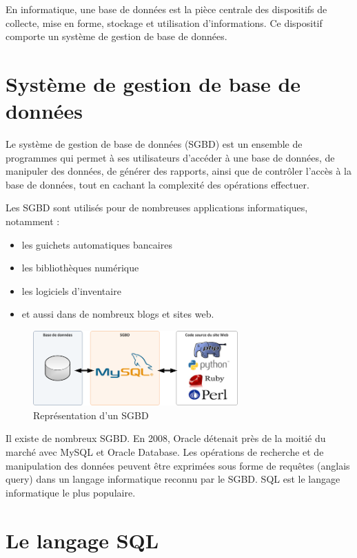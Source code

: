 \documentclass[oneside,13pt,a4paper]{report}
\begin{document}
En informatique, une base de données est la pièce centrale des dispositifs de collecte, mise en forme, stockage et utilisation d'informations.
Ce dispositif comporte un système de gestion de base de données.

\section{Système de gestion de base de données}
\label{sgbd}
Le système de gestion de base de données (SGBD) est un ensemble de programmes qui permet à ses utilisateurs d'accéder à une base de données,
de manipuler des données, de générer des rapports, ainsi que de contrôler l'accès à la base de données,
tout en cachant la complexité des opérations effectuer.

Les SGBD sont utilisés pour de nombreuses applications informatiques, notamment :
\begin{itemize}
	\item les guichets automatiques bancaires
	\item les bibliothèques numérique
	\item les logiciels d'inventaire
	\item et aussi dans de nombreux blogs et sites web.
\end{itemize}


\begin{figure}[h]
	\centering
	\includegraphics[width=0.7\textwidth]{img/sgbd.png}
	\caption{Représentation d'un SGBD}
\end{figure}

Il existe de nombreux SGBD. En 2008, Oracle détenait près de la moitié du marché avec MySQL et Oracle Database.
Les opérations de recherche et de manipulation des données peuvent être exprimées sous forme de requêtes (anglais query)
dans un langage informatique reconnu par le SGBD. SQL est le langage informatique le plus populaire.

\section{Le langage SQL}
\end{document}
